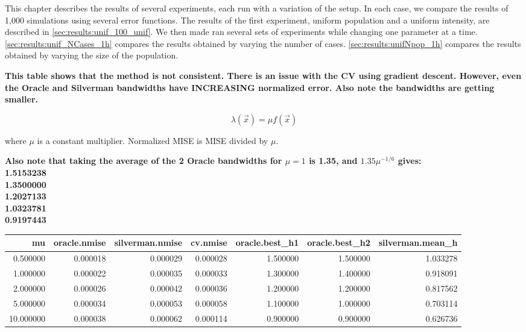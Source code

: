 

This chapter describes the results of several experiments, each run with a variation of the setup.
In each case, we compare the results of 1,000 simulations using several error functions.
The results of the first experiment, uniform population and a uniform intensity,
are described in \autoref{sec:results:unif_100_unif}.
We then made ran several sets of experiments while changing one parameter at a time.
\autoref{sec:results:unif_NCases_1h} compares the results obtained by varying the number of cases.
\autoref{sec:results:unifNpop_1h} compares the results obtained by varying the size of the population.

\textbf{
\color{red}
This table shows that the method is not consistent.
There is an issue with the CV using gradient descent.
However, even the Oracle and Silverman bandwidths have INCREASING normalized error.
Also note the bandwidths are getting smaller.
}

$$
\lambda(\vec{x}) = \mu f\!(\vec{x})
$$

where $\mu$ is a constant multiplier.
Normalized MISE is MISE divided by $\mu$.

\textbf{
    \color{red}
    Also note that taking the average of the 2 Oracle bandwidths for $\mu=1$ is 1.35,
    and $1.35 \mu^{-1/6}$ gives:
    \\
    1.5153238 \\
    1.3500000 \\
    1.2027133 \\
    1.0323781 \\
    0.9197443
}

\begin{table}[ht]
\centering
\small
\color{red}
\begin{tabular}{rrrrrrr}
  \hline
mu & oracle.nmise & silverman.nmise & cv.nmise & oracle.best\_h1 & oracle.best\_h2 & silverman.mean\_h \\ 
  \hline
0.500000 & 0.000018 & 0.000029 & 0.000028 & 1.500000 & 1.500000 & 1.033278 \\ 
  1.000000 & 0.000022 & 0.000035 & 0.000033 & 1.300000 & 1.400000 & 0.918091 \\ 
  2.000000 & 0.000026 & 0.000042 & 0.000036 & 1.200000 & 1.200000 & 0.817562 \\ 
  5.000000 & 0.000034 & 0.000053 & 0.000058 & 1.100000 & 1.000000 & 0.703114 \\ 
  10.000000 & 0.000038 & 0.000062 & 0.000114 & 0.900000 & 0.900000 & 0.626736 \\ 
   \hline
\end{tabular}
\end{table}

